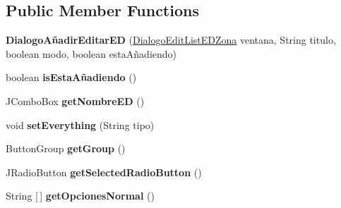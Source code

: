 \subsection*{Public Member Functions}
\begin{DoxyCompactItemize}
\item 
\mbox{\label{classvista_1_1_dialogo_a_xC3_xB1adir_editar_e_d_a6eee77dd9a1cefe1069f58a427ea720e}} 
{\bfseries Dialogo\+Añadir\+Editar\+ED} (\mbox{\hyperlink{classvista_1_1_dialogo_edit_list_e_d_zona}{Dialogo\+Edit\+List\+E\+D\+Zona}} ventana, String titulo, boolean modo, boolean esta\+Añadiendo)
\item 
\mbox{\label{classvista_1_1_dialogo_a_xC3_xB1adir_editar_e_d_a8fc12de0e1c8f392d5bfb9c536b08681}} 
boolean {\bfseries is\+Esta\+Añadiendo} ()
\item 
\mbox{\label{classvista_1_1_dialogo_a_xC3_xB1adir_editar_e_d_a07093fd106d820f76588c874aba95cc1}} 
J\+Combo\+Box {\bfseries get\+Nombre\+ED} ()
\item 
\mbox{\label{classvista_1_1_dialogo_a_xC3_xB1adir_editar_e_d_a117c2dfd237e5bc25fc4e49f531dcaab}} 
void {\bfseries set\+Everything} (String tipo)
\item 
\mbox{\label{classvista_1_1_dialogo_a_xC3_xB1adir_editar_e_d_a8da67d26b1a48c253fdc8c7bd4424d74}} 
Button\+Group {\bfseries get\+Group} ()
\item 
\mbox{\label{classvista_1_1_dialogo_a_xC3_xB1adir_editar_e_d_a57e203c700fd371e0bebd55c8b347c07}} 
J\+Radio\+Button {\bfseries get\+Selected\+Radio\+Button} ()
\item 
\mbox{\label{classvista_1_1_dialogo_a_xC3_xB1adir_editar_e_d_aa7d9b9ec930df09cb84dd3336f121688}} 
String \mbox{[}$\,$\mbox{]} {\bfseries get\+Opciones\+Normal} ()
\item 
\mbox{\label{classvista_1_1_dialogo_a_xC3_xB1adir_editar_e_d_acbbbc6b7ab5d077466db0fd993c9364d}} 

\end{DoxyCompactItemize}
